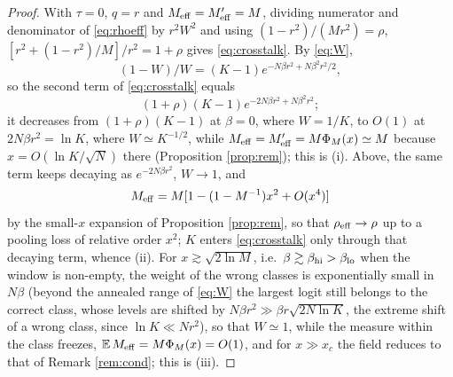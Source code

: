 \documentclass{SciPost}
\theoremstyle{plain}
\theoremstyle{definition}
\newcommand{\E}{\mathbb{E}}
\newcommand{\Meff}{M_{\rm eff}}
\begin{document}
\begin{proof}
With $\tau=0$, $q=r$ and $\Meff=\Meff'=M$, dividing numerator and denominator of \eqref{eq:rhoeff} by $r^2W^2$ and using $(1-r^2)/(Mr^2)=\rho$, $[r^2+(1-r^2)/M]/r^2=1+\rho$ gives \eqref{eq:crosstalk}. By \eqref{eq:W},
\begin{equation*}
(1-W)/W=(K-1)e^{-N\beta r^2+N\beta^2r^2/2},
\end{equation*}
so the second term of \eqref{eq:crosstalk} equals
\begin{equation*}
(1+\rho)(K-1)e^{-2N\beta r^2+N\beta^2r^2};
\end{equation*}
it decreases from $(1+\rho)(K-1)$ at $\beta=0$, where $W=1/K$, to $O(1)$ at $2N\beta r^2=\ln K$, where $W\simeq K^{-1/2}$, while $\Meff=\Meff'=M\Phi_M(x)\simeq M$ because $x=O(\ln K/\sqrt N)$ there (Proposition \ref{prop:rem}); this is (i). Above, the same term keeps decaying as $e^{-2N\beta r^2}$, $W\to1$, and
\begin{equation*}
\Meff=M[1-(1-M^{-1})x^2+O(x^4)]
\end{equation*}
by the small-$x$ expansion of Proposition \ref{prop:rem}, so that $\rho_{\rm eff}\to\rho$ up to a pooling loss of relative order $x^2$; $K$ enters \eqref{eq:crosstalk} only through that decaying term, whence (ii). For $x\gtrsim\sqrt{2\ln M}$, i.e.\ $\beta\gtrsim\beta_{\rm hi}>\beta_{\rm lo}$ when the window is non-empty, the weight of the wrong classes is exponentially small in $N\beta$ (beyond the annealed range of \eqref{eq:W} the largest logit still belongs to the correct class, whose levels are shifted by $N\beta r^2\gg\beta r\sqrt{2N\ln K}$, the extreme shift of a wrong class, since $\ln K\ll Nr^2$), so that $W\simeq1$, while the measure within the class freezes, $\E\,\Meff=M\Phi_M(x)=O(1)$, and for $x\gg x_c$ the field reduces to that of Remark \ref{rem:cond}; this is (iii).


\end{proof}
\end{document}
